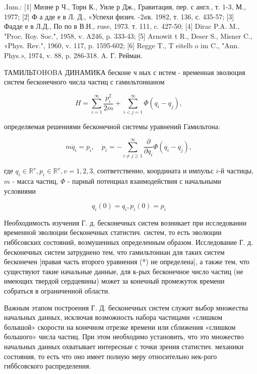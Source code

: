 \documentclass[10pt]{article}
\begin{document}
.Ium.: [1] Мизне р Ч., Торн К., Уиле р Дж., Гравитация, пер. с англ., т. 1-3, М., 1977; [2] Ф а дде е в Л. Д., «Успехи физич. -2๙к. 1982, т. 136, с. 435-57; [3] Фадде е в Л.Д., По по в В.Н., ruse, 1973. т. 111, c. 427-50; [4] Dirac P.A. M., "Proc. Roy. Soc.", 1958, v. A246, p. 333-43; [5] Arnowit t R., Deser S., Misner C., «Phys. Rev.", 1960, v. 117, p. 1595-602; [6] Regge T., T eitelb o im C., "Ann. Phys.», 1974, v. 88, p. 286-318. A. Г. Рейман.



ТАМИЛЬТOHOBA ДИНАМИКА бесконе ч ных с истем - временная эволюция систем бесконечного числа частиц с гамильтонианом



\[

H=\sum_{i=1}^{\infty} \frac{p_{i}^{2}}{2 m}+\sum_{i<j=1}^{\infty} \Phi\left(q_{i}-q_{j}\right),

\]



определяемая решениями бесконечной системы уравнений Гамильтона:



\[

m \dot{q}_{i}=p_{i}, \quad \dot{p}_{i}=-\sum_{i \neq j \geqslant 1}^{\infty} \frac{\partial}{\partial q_{i}} \Phi\left(q_{i}-q_{j}\right),

\]



где $q_{i} \in \mathbb{R}^{v}, p_{i} \in \mathbb{R}^{v}, v=1,2,3$, соответственно, координата и импульс $i$-й частицы, $m$ - масса частиц, $\Phi$ - парный потенциал взаимодействия с начальными условиями



\[

q_{i}(0)=q_{i}, p_{i}(0)=p_{i}

\]



Необходимость изучения Г. д. бесконечных систем возникает при исследовании временной эволюции бесконечных статистич. систем, то есть эволюции гиббсовских состояний, возмушенных определенным образом. Исследование Г. д. бесконечных систем затруднено тем, что гамильтониан для таких систем бесконечен [правая часть второго уравнения (*) не определена], а также тем, что существуют такие начальные данные, для к-рых бесконечное число частиц (не имеющих твердой сердцевины) может за конечный промежуток времени собраться в ограниченной области.



Важным этапом построения Г. Д. бесконечных систем служит выбор множества начальных данных, исключая возможность набора частицами «слишком болышой» скорости на конечном отрезке времени или сближения «слишком большого» числа частиц. При этом необходимо установить, что это множество начальных данных охватывает интересные с точки зрения статистич. механики состояния, то есть что оно имеет полную меру относительно нек-рого гиббсовского распределения.
\end{document}
